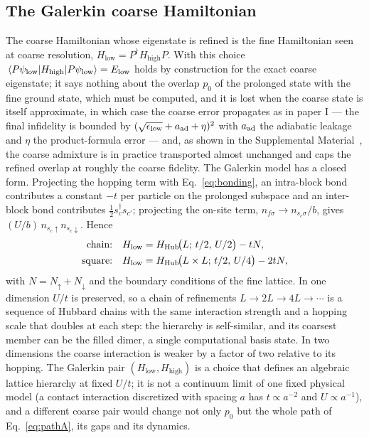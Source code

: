 \documentclass[a4paper,11pt,noarxiv]{quantumarticle}
\newcommand{\Hlow}{H_{\mathrm{low}}}
\newcommand{\Hhigh}{H_{\mathrm{high}}}
\newcommand{\SM}{Supplemental Material~\cite{SM}}
\begin{document}
\subsection{The Galerkin coarse Hamiltonian}
\label{sec:galerkin}
The coarse Hamiltonian whose eigenstate is refined is the fine Hamiltonian
seen at coarse resolution, $\Hlow=P^\dagger\Hhigh P$.  With this choice
$\expval{\Hhigh}{P\psi_{\rm low}}=E_{\rm low}$ holds by construction for the
exact coarse eigenstate; it says nothing about the overlap $p_0$ of the
prolonged state with the fine ground state, which must be computed, and it
is lost when the coarse state is itself approximate, in which case the
coarse error propagates as in paper I --- the final infidelity is bounded by
$(\sqrt{\epsilon_{\rm low}}+a_{\rm ad}+\eta)^2$ with $a_{\rm ad}$ the
adiabatic leakage and $\eta$ the product-formula error --- and, as shown in
the \SM, the coarse admixture is in practice transported almost unchanged
and caps the refined overlap at roughly the coarse fidelity.  The Galerkin
model has a closed form.  Projecting the hopping term with
Eq.~\eqref{eq:bonding}, an intra-block bond contributes a constant $-t$ per
particle on the prolonged subspace and an inter-block bond contributes
$\tfrac12s^\dagger_cs_{c'}$; projecting the on-site term,
$n_{f\sigma}\to n_{s_c\sigma}/b$, gives $(U/b)\,n_{s_c\uparrow}n_{s_c\downarrow}$.
Hence
\begin{align}
  \text{chain:}\quad &\Hlow=H_{\rm Hub}\!\big(L;\,t/2,\,U/2\big)-tN, \label{eq:gal1d}\\
  \text{square:}\quad&\Hlow=H_{\rm Hub}\!\big(L\times L;\,t/2,\,U/4\big)-2tN, \label{eq:gal2d}
\end{align}
with $N=N_\uparrow+N_\downarrow$ and the boundary conditions of the fine
lattice.  In one dimension $U/t$ is preserved, so a chain of refinements
$L\to2L\to4L\to\cdots$ is a sequence of Hubbard chains with the same
interaction strength and a hopping scale that doubles at each step: the
hierarchy is self-similar, and its coarsest member can be the filled dimer,
a single computational basis state.  In two dimensions the coarse
interaction is weaker by a factor of two relative to its hopping.  The
Galerkin pair $(\Hlow,\Hhigh)$ is a choice that defines an algebraic
lattice hierarchy at fixed $U/t$; it is not a continuum limit of one fixed
physical model (a contact interaction discretized with spacing $a$ has
$t\propto a^{-2}$ and $U\propto a^{-1}$), and a different coarse pair would
change not only $p_0$ but the whole path of Eq.~\eqref{eq:pathA}, its gaps
and its dynamics.
\end{document}
